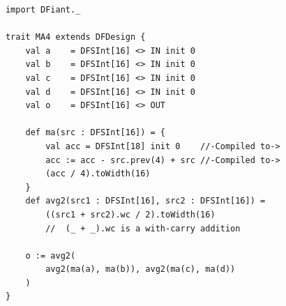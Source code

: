 
\begin{table}[t!]
  \centering
  \begin{minipage}[t][11.8cm][t]{0.505\linewidth}
    \centering
    \captionsetup{justification=centering}    
    \begin{verbatim}
			import DFiant._
			
			trait MA4 extends DFDesign {
				val a    = DFSInt[16] <> IN init 0
				val b    = DFSInt[16] <> IN init 0
				val c    = DFSInt[16] <> IN init 0
				val d    = DFSInt[16] <> IN init 0
				val o    = DFSInt[16] <> OUT
				
				def ma(src : DFSInt[16]) = {     
					val acc = DFSInt[18] init 0    //-Compiled to->
					acc := acc - src.prev(4) + src //-Compiled to->
					(acc / 4).toWidth(16)
				}
				def avg2(src1 : DFSInt[16], src2 : DFSInt[16]) =
					((src1 + src2).wc / 2).toWidth(16)
					//  (_ + _).wc is a with-carry addition
					
				o := avg2(
					avg2(ma(a), ma(b)), avg2(ma(c), ma(d))
				)
			}
			
			
			
			
			
			
			
			
			

\end{verbatim}
\end{minipage}
\end{table}
